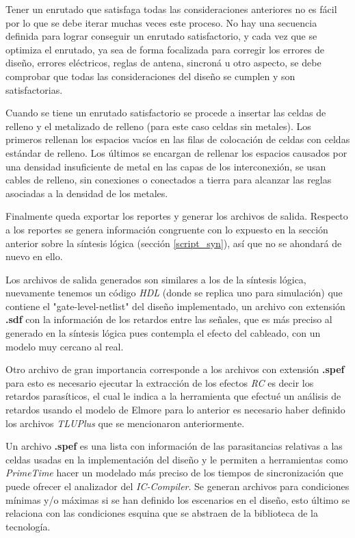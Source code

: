 Tener un enrutado que satisfaga todas las consideraciones anteriores no es fácil por lo que se debe iterar muchas veces este proceso. No hay una secuencia definida para lograr conseguir un enrutado satisfactorio, y cada vez que se optimiza el enrutado, ya sea de forma focalizada para corregir los errores de diseño, errores eléctricos, reglas de antena, sincroná u otro aspecto, se debe comprobar que todas las consideraciones del diseño se cumplen y son satisfactorias.

Cuando se tiene un enrutado satisfactorio se procede a insertar las celdas de relleno y el metalizado de relleno (para este caso celdas sin metales). Los primeros rellenan los espacios vacíos en las filas de colocación de celdas con celdas estándar de relleno. Los últimos se encargan de rellenar los espacios causados por una densidad insuficiente de metal en las capas de los interconexión, se usan cables de relleno, sin conexiones o conectados a tierra para alcanzar las reglas asociadas a la densidad de los metales.

Finalmente queda exportar los reportes y generar los archivos de salida. Respecto a los reportes se genera información congruente con lo expuesto en la sección anterior sobre la síntesis lógica (sección \ref{script_syn}), así que no se ahondará de nuevo en ello.

Los archivos de salida generados son similares a los de la síntesis lógica, nuevamente tenemos un código \textit{HDL} (donde se replica uno para simulación) que contiene el "gate-level-netlist" del diseño implementado, un archivo con extensión \textbf{.sdf} con la información de los retardos entre las señales, que es más preciso al generado en la síntesis lógica pues contempla el efecto del cableado, con un modelo muy cercano al real.

Otro archivo de gran importancia corresponde a los archivos con extensión \textbf{.spef} para esto es necesario ejecutar la extracción de los efectos \textit{RC} es decir los retardos parasíticos, el cual le indica a la herramienta que efectué un análisis de retardos usando el modelo de Elmore \cite{book:weste2005} para lo anterior es necesario haber definido los archivos \textit{TLUPlus} que se mencionaron anteriormente.

Un archivo \textbf{.spef} es una lista con información de las parasitancias relativas a las celdas usadas en la implementación del diseño y le permiten a herramientas como \textit{PrimeTime} hacer un modelado más preciso de los tiempos de sincronización que puede ofrecer el analizador del \textit{IC-Compiler}. Se generan archivos para condiciones mínimas y/o máximas si se han definido los escenarios en el diseño, esto último se relaciona con las condiciones esquina que se abstraen de la biblioteca de la tecnología.

